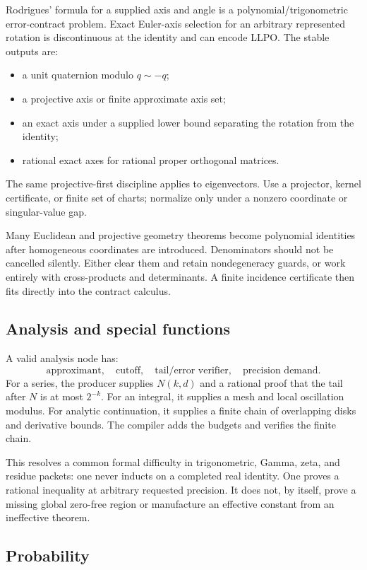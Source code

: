 Rodrigues' formula for a supplied axis and angle is a polynomial/trigonometric
error-contract problem.  Exact Euler-axis selection for an arbitrary
represented rotation is discontinuous at the identity and can encode LLPO.
The stable outputs are:
\begin{itemize}[leftmargin=1.6em]
\item a unit quaternion modulo \(q\sim-q\);
\item a projective axis or finite approximate axis set;
\item an exact axis under a supplied lower bound separating the rotation from
      the identity;
\item rational exact axes for rational proper orthogonal matrices.
\end{itemize}
The same projective-first discipline applies to eigenvectors.  Use a
projector, kernel certificate, or finite set of charts; normalize only under a
nonzero coordinate or singular-value gap.

Many Euclidean and projective geometry theorems become polynomial identities
after homogeneous coordinates are introduced.  Denominators should not be
cancelled silently.  Either clear them and retain nondegeneracy guards, or
work entirely with cross-products and determinants.  A finite incidence
certificate then fits directly into the contract calculus.

\subsection{Analysis and special functions}

A valid analysis node has:
\[
   \text{approximant},\quad
   \text{cutoff},\quad
   \text{tail/error verifier},\quad
   \text{precision demand}.
\]
For a series, the producer supplies \(N(k,d)\) and a rational proof that the
tail after \(N\) is at most \(2^{-k}\).  For an integral, it supplies a mesh
and local oscillation modulus.  For analytic continuation, it supplies a
finite chain of overlapping disks and derivative bounds.  The compiler adds
the budgets and verifies the finite chain.

This resolves a common formal difficulty in trigonometric, Gamma, zeta, and
residue packets: one never inducts on a completed real identity.  One proves
a rational inequality at arbitrary requested precision.  It does not, by
itself, prove a missing global zero-free region or manufacture an effective
constant from an ineffective theorem.

\subsection{Probability}

